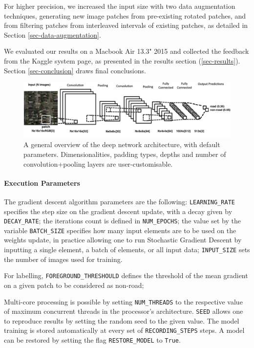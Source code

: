 \documentclass[fleqn,9 pt]{SelfArx} %
\begin{document}
\begin{sloppypar}
For higher precision, we increased the input size with two data augmentation techniques, generating new image patches from pre-existing rotated patches, and from filtering patches from interleaved intervals of existing patches, as detailed in Section \ref{sec-data-augmentation}.

We evaluated our results on a Macbook Air 13.3" 2015 and collected the feedback from the Kaggle system page, as presented in the results section (\ref{sec-results}). Section \ref{sec-conclusion} draws final conclusions.

\begin{figure}
\centering
\includegraphics[width=1\textwidth]{figures/conv_2d_network.png}
\caption{A general overview of the deep network architecture, with default parameters. Dimensionalities, padding types, depths and number of convolution+pooling layers are user-customisable.}
\label{fig-conv-2d-architecture}
\end{figure}

\paragraph{Execution Parameters}
\label{sec-execution-parameters}

The gradient descent algorithm parameters are the following: \texttt{LEARNING\_RATE} specifies the step size on the gradient descent update, with a decay given by \texttt{DECAY\_RATE}; the iterations count is defined in \texttt{NUM\_EPOCHS}; the value set by the variable \texttt{BATCH\_SIZE} specifies how many input elements are to be used on the weights update, in practice allowing one to run Stochastic Gradient Descent by inputting a single element, a batch of elements, or all input data; \texttt{INPUT\_SIZE} sets the number of images used for training.

For labelling, \texttt{FOREGROUND\_THRESHOULD} defines the threshold of the mean gradient on a given patch to be considered as non-road;

Multi-core processing is possible by setting \texttt{NUM\_THREADS} to the respective value of maximum concurrent threads in the processor's architecture. \texttt{SEED} allows one to reproduce results by setting the random seed to the given value. The model training is stored automatically at every set of \texttt{RECORDING\_STEPS} steps. A model can be restored by setting the flag \texttt{RESTORE\_MODEL} to \texttt{True}.


\end{sloppypar}
\end{document}
